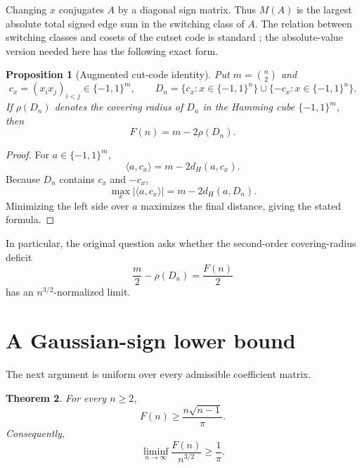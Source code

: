 \documentclass[11pt]{article}
\newtheorem{theorem}{Theorem}
\newtheorem{proposition}[theorem]{Proposition}
\newcommand{\eps}{\{-1,1\}}
\begin{document}
Changing \(x\) conjugates \(A\) by a diagonal sign matrix. Thus \(M(A)\)
is the largest absolute total signed edge sum in the switching class of
\(A\). The relation between switching classes and cosets of the cutset
code is standard \cite{sole-zaslavsky}; the absolute-value version needed
here has the following exact form.

\begin{proposition}[Augmented cut-code identity]
\label{prop:code}
Put \(m=\binom n2\) and
\[
 c_x=(x_ix_j)_{i<j}\in\eps^m,\qquad
 D_n=\{c_x:x\in\eps^n\}\cup\{-c_x:x\in\eps^n\}.
\]
If \(\rho(D_n)\) denotes the covering radius of \(D_n\) in the Hamming
cube \(\eps^m\), then
\[
 \boxed{F(n)=m-2\rho(D_n).}
\]
\end{proposition}

\begin{proof}
For \(a\in\eps^m\),
\[
 \langle a,c_x\rangle=m-2d_H(a,c_x).
\]
Because \(D_n\) contains \(c_x\) and \(-c_x\),
\[
 \max_x|\langle a,c_x\rangle|
 =m-2d_H(a,D_n).
\]
Minimizing the left side over \(a\) maximizes the final distance, giving
the stated formula.
\end{proof}

In particular, the original question asks whether the second-order
covering-radius deficit
\[
 \frac m2-\rho(D_n)=\frac{F(n)}2
\]
has an \(n^{3/2}\)-normalized limit.

\section{A Gaussian-sign lower bound}

The next argument is uniform over every admissible coefficient matrix.

\begin{theorem}
\label{thm:lower}
For every \(n\ge2\),
\[
 \boxed{F(n)\ge \frac{n\sqrt{n-1}}{\pi}.}
\]
Consequently,
\[
 \liminf_{n\to\infty}\frac{F(n)}{n^{3/2}}\ge\frac1\pi.
\]
\end{theorem}
\end{document}
